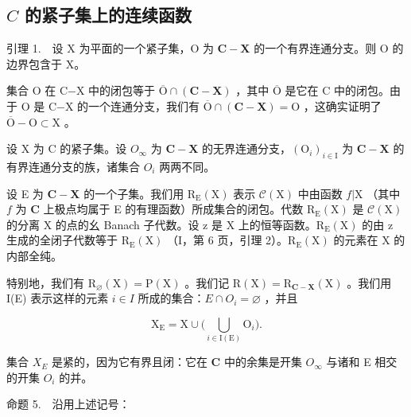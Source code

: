 \subsection{\texorpdfstring{\(C\) 的紧子集上的连续函数}{C 的紧子集上的连续函数}}

引理 1.　设 X 为平面的一个紧子集，O 为 \(\mathbf{C} - \mathbf{X}\) 的一个有界连通分支。则 O 的边界包含于 X。

集合 O 在 C−X 中的闭包等于 \(\overline{\mathrm{O}}\cap (\mathbf{C} - \mathbf{X})\) ，其中 \(\overline{\mathrm{O}}\) 是它在 C 中的闭包。由于 O 是 C−X 的一个连通分支，我们有 \(\overline{\mathrm{O}}\cap (\mathbf{C} - \mathbf{X}) = \mathrm{O}\) ，这确实证明了 \(\overline{\mathrm{O}} -\mathrm{O}\subset \mathrm{X}\) 。

设 X 为 C 的紧子集。设 \(O_{\infty}\) 为 \(\mathbf{C} - \mathbf{X}\) 的无界连通分支，\((\mathrm{O}_{i})_{i\in\mathrm{I}}\) 为 \(\mathbf{C} - \mathbf{X}\) 的有界连通分支的族，诸集合 \(O_{i}\) 两两不同。

设 E 为 \(\mathbf{C} - \mathbf{X}\) 的一个子集。我们用 \(\mathrm{R}_{\mathrm{E}}(\mathrm{X})\) 表示 \(\mathcal{C}(\mathrm{X})\) 中由函数 \(f|\mathrm{X}\) （其中 \(f\) 为 \(\mathbf{C}\) 上极点均属于 E 的有理函数）所成集合的闭包。代数 \(\mathrm{R}_{\mathrm{E}}(\mathrm{X})\) 是 \(\mathcal{C}(\mathrm{X})\) 的分离 X 的点的幺 Banach 子代数。设 z 是 X 上的恒等函数。\(\mathrm{R}_{\mathrm{E}}(\mathrm{X})\) 的由 z 生成的全闭子代数等于 \(\mathrm{R}_{\mathrm{E}}(\mathrm{X})\) （I，第 6 页，引理 2）。\(\mathrm{R}_{\mathrm{E}}(\mathrm{X})\) 的元素在 X 的内部全纯。

特别地，我们有 \(\mathrm{R}_{\varnothing}(\mathrm{X})=\mathrm{P}(\mathrm{X})\) 。我们记 \(\mathrm{R}(\mathrm{X})=\mathrm{R}_{\mathbf{C}-\mathbf{X}}(\mathrm{X})\) 。我们用 I(E) 表示这样的元素 \(i\in I\) 所成的集合：\(E\cap O_{i}=\varnothing\) ，并且

\[
\mathrm{X} _ {\mathrm{E}} = \mathrm{X} \cup \Big (\bigcup_ {i \in \mathrm{I} (\mathrm{E})} \mathrm{O} _ {i} \Big).
\]

集合 \(X_{E}\) 是紧的，因为它有界且闭：它在 \(\mathbf{C}\) 中的余集是开集 \(O_{\infty}\) 与诸和 E 相交的开集 \(O_{i}\) 的并。

命题 5.　沿用上述记号：

